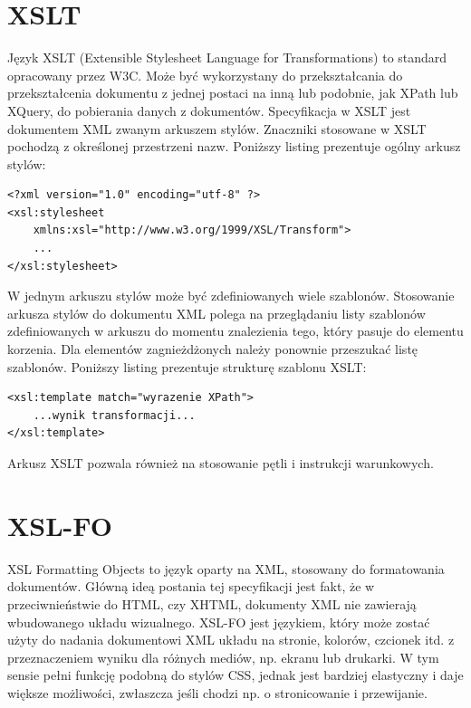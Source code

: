 \documentclass[11pt,a4paper]{article}
\begin{document}
\section{XSLT} \label{sec:xslt}
Język XSLT (Extensible Stylesheet Language for Transformations) to standard opracowany przez W3C. Może być wykorzystany do przekształcania do przekształcenia dokumentu z jednej postaci na inną lub podobnie, jak XPath lub XQuery, do pobierania danych z dokumentów. Specyfikacja w XSLT jest dokumentem XML zwanym arkuszem stylów. Znaczniki stosowane w XSLT pochodzą z określonej przestrzeni nazw. Poniższy listing prezentuje ogólny arkusz stylów:\\

\lstset{language=XSLT}
\begin{lstlisting}[frame=single,caption=Ogólny arkusz XSLT,label=simplexslt]
<?xml version="1.0" encoding="utf-8" ?>
<xsl:stylesheet 
	xmlns:xsl="http://www.w3.org/1999/XSL/Transform">
	...
</xsl:stylesheet>
\end{lstlisting}

W jednym arkuszu stylów może być zdefiniowanych wiele szablonów. Stosowanie arkusza stylów do dokumentu XML polega na przeglądaniu listy szablonów zdefiniowanych w arkuszu do momentu znalezienia tego, który pasuje do elementu korzenia. Dla elementów zagnieżdżonych należy ponownie przeszukać listę szablonów. Poniższy listing prezentuje strukturę szablonu XSLT:\\
\lstset{language=XSLT}
\begin{lstlisting}[frame=single,caption=Ogólny szablon XSLT,label=simplexsltszablon]
<xsl:template match="wyrazenie XPath">
	...wynik transformacji...
</xsl:template>
\end{lstlisting}

Arkusz XSLT pozwala również na stosowanie pętli i instrukcji warunkowych.


\section{XSL-FO} \label{sec:xslfo}
XSL Formatting Objects to język oparty na XML, stosowany do formatowania dokumentów. Główną ideą postania tej specyfikacji jest fakt, że w przeciwnieństwie do HTML, czy XHTML, dokumenty XML nie zawierają wbudowanego układu wizualnego. XSL-FO jest językiem, który może zostać użyty do nadania dokumentowi XML układu na stronie, kolorów, czcionek itd. z przeznaczeniem wyniku dla różnych mediów, np. ekranu lub drukarki. W tym sensie pełni funkcję podobną do stylów CSS, jednak jest bardziej elastyczny i daje większe możliwości, zwłaszcza jeśli chodzi np. o stronicowanie i przewijanie.
\end{document}
